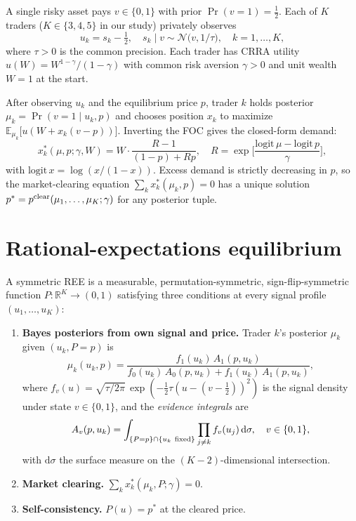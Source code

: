 \documentclass[11pt]{article}
\newcommand{\E}{\mathbb{E}}
\newcommand{\R}{\mathbb{R}}
\newcommand{\1}{\mathbf{1}}
\begin{document}
A single risky asset pays $v\in\{0,1\}$ with prior $\Pr(v=1)=\tfrac12$.
Each of $K$ traders ($K\in\{3,4,5\}$ in our study) privately observes
\begin{equation}
u_k = s_k - \tfrac12, \quad s_k \mid v \sim \mathcal{N}\bigl(v, 1/\tau\bigr),
\quad k=1,\ldots,K,
\label{eq:signal}
\end{equation}
where $\tau>0$ is the common precision.  Each trader has CRRA utility
$u(W) = W^{1-\gamma}/(1-\gamma)$ with common risk aversion $\gamma>0$
and unit wealth $W=1$ at the start.

After observing $u_k$ and the equilibrium price $p$, trader $k$ holds
posterior $\mu_k = \Pr(v=1 \mid u_k, p)$ and chooses position $x_k$ to
maximize $\E_{\mu_k}\bigl[u(W+x_k(v-p))\bigr]$.  Inverting the FOC gives
the closed-form demand:
\begin{equation}
x_k^*(\mu, p; \gamma, W) = W\cdot \frac{R-1}{(1-p) + Rp},
\quad R = \exp\biggl[\frac{\mathrm{logit}\,\mu - \mathrm{logit}\,p}{\gamma}\biggr],
\label{eq:demand}
\end{equation}
with $\mathrm{logit}\,x = \log(x/(1-x))$.  Excess demand is strictly
decreasing in $p$, so the market-clearing equation $\sum_k x_k^*(\mu_k,
p) = 0$ has a unique solution $p^* = p^{\rm clear}(\mu_1,\ldots,\mu_K;
\gamma)$ for any posterior tuple.

\section{Rational-expectations equilibrium}
\label{sec:REE}

A symmetric REE is a measurable, permutation-symmetric, sign-flip-symmetric
function $P:\R^K\to(0,1)$ satisfying three conditions at every signal
profile $(u_1,\ldots,u_K)$:
\begin{enumerate}
\item \textbf{Bayes posteriors from own signal and price.}
Trader $k$'s posterior $\mu_k$ given $(u_k, P=p)$ is
\begin{equation}
\mu_k(u_k, p) = \frac{f_1(u_k)\,A_1(p, u_k)}{f_0(u_k)\,A_0(p, u_k) + f_1(u_k)\,A_1(p, u_k)},
\label{eq:bayes}
\end{equation}
where $f_v(u) = \sqrt{\tau/2\pi}\,\exp(-\tfrac12\tau(u-(v-\tfrac12))^2)$ is
the signal density under state $v\in\{0,1\}$, and the \emph{evidence
integrals} are
\begin{equation}
A_v(p, u_k) = \int_{\{P=p\}\cap\{u_k\ \rm fixed\}}
\prod_{j\ne k} f_v(u_j) \, \mathrm{d}\sigma,
\quad v\in\{0,1\},
\label{eq:evidence}
\end{equation}
with $\mathrm{d}\sigma$ the surface measure on the $(K{-}2)$-dimensional
intersection.
\item \textbf{Market clearing.} $\sum_k x_k^*(\mu_k, P; \gamma) = 0$.
\item \textbf{Self-consistency.} $P(u) = p^*$ at the cleared price.
\end{enumerate}
\end{document}
